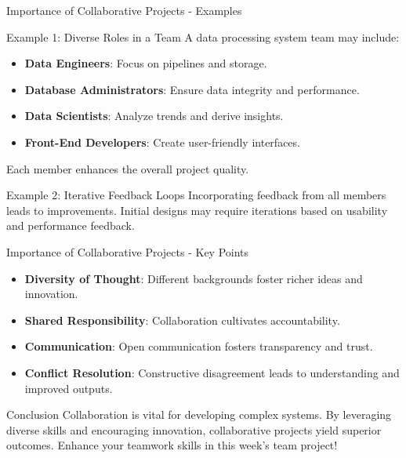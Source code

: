 \documentclass[aspectratio=169]{beamer}
\begin{document}
\begin{frame}[fragile]{Importance of Collaborative Projects - Examples}
    \begin{block}{Example 1: Diverse Roles in a Team}
        A data processing system team may include:
        \begin{itemize}
            \item \textbf{Data Engineers}: Focus on pipelines and storage.
            \item \textbf{Database Administrators}: Ensure data integrity and performance.
            \item \textbf{Data Scientists}: Analyze trends and derive insights.
            \item \textbf{Front-End Developers}: Create user-friendly interfaces.
        \end{itemize}
        Each member enhances the overall project quality.
    \end{block}
    
    \begin{block}{Example 2: Iterative Feedback Loops}
        Incorporating feedback from all members leads to improvements. Initial designs may require iterations based on usability and performance feedback.
    \end{block}
\end{frame}

\begin{frame}[fragile]{Importance of Collaborative Projects - Key Points}
    \begin{itemize}
        \item \textbf{Diversity of Thought}: Different backgrounds foster richer ideas and innovation.
        \item \textbf{Shared Responsibility}: Collaboration cultivates accountability.
        \item \textbf{Communication}: Open communication fosters transparency and trust.
        \item \textbf{Conflict Resolution}: Constructive disagreement leads to understanding and improved outputs.
    \end{itemize}
    
    \begin{block}{Conclusion}
        Collaboration is vital for developing complex systems. By leveraging diverse skills and encouraging innovation, collaborative projects yield superior outcomes. Enhance your teamwork skills in this week’s team project!
    \end{block}
\end{frame}
\end{document}
